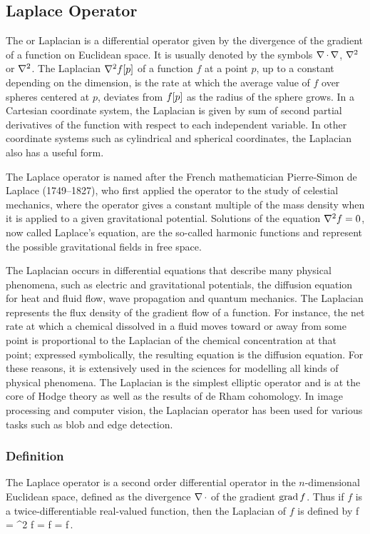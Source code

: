 \subsection{Laplace Operator}
The  or Laplacian is a differential operator given by the divergence of the gradient of a function on Euclidean space. It is usually denoted by the symbols $\nabla\operatorname{\cdot}\nabla$, $\nabla^2$ or $\nabla^2$. The Laplacian $\nabla^2 f\!\left[{p}\right]$ of a function $f$ at a point $p$, up to a constant depending on the dimension, is the rate at which the average value of $f$ over spheres centered at $p$, deviates from $f\!\left[{p}\right]$ as the radius of the sphere grows. In a Cartesian coordinate system, the Laplacian is given by sum of second partial derivatives of the function with respect to each independent variable. In other coordinate systems such as cylindrical and spherical coordinates, the Laplacian also has a useful form.

The Laplace operator is named after the French mathematician Pierre-Simon de Laplace (1749–1827), who first applied the operator to the study of celestial mechanics, where the operator gives a constant multiple of the mass density when it is applied to a given gravitational potential. Solutions of the equation $\nabla^2 f = 0$, now called Laplace's equation, are the so-called harmonic functions and represent the possible gravitational fields in free space.

The Laplacian occurs in differential equations that describe many physical phenomena, such as electric and gravitational potentials, the diffusion equation for heat and fluid flow, wave propagation and quantum mechanics. The Laplacian represents the flux density of the gradient flow of a function. For instance, the net rate at which a chemical dissolved in a fluid moves toward or away from some point is proportional to the Laplacian of the chemical concentration at that point; expressed symbolically, the resulting equation is the diffusion equation. For these reasons, it is extensively used in the sciences for modelling all kinds of physical phenomena. The Laplacian is the simplest elliptic operator and is at the core of Hodge theory as well as the results of de Rham cohomology. In image processing and computer vision, the Laplacian operator has been used for various tasks such as blob and edge detection.


\subsubsection{Definition}
The Laplace operator is a second order differential operator in the $n$-dimensional Euclidean space, defined as the divergence $\nabla\operatorname{\cdot}$ of the gradient $\operatorname{grad} f$. Thus if $f$ is a twice-differentiable real-valued function, then the Laplacian of $f$ is defined by
\beq
\lder f = \gder^2 f = \gder\iprod\gder f = \div\grad f\,.
\eeq

